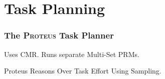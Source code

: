 \chapter{Task Planning}
\label{chap:task-planning}

\subsection{The \textsc{Proteus} Task Planner}

Uses CMR.
Runs separate Multi-Set PRMs.

Proteus Reasons Over Task Effort Using Sampling.
